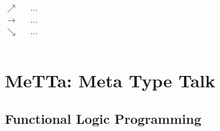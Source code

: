 \documentclass[aspectratio=169]{beamer}
\begin{document}
\begin{frame}
\begin{columns}
    \pause

    \column{1cm}
    \begin{center}
      $\nearrow$\\
      $\rightarrow$\\
      $\searrow$\\[2cm]
    \end{center}
    \vphantom{}

    \column{1cm}
    \begin{center}
      $\dots$\\
      $\dots$\\
      $\dots$\\[2cm]
    \end{center}
    \vphantom{}

  \end{columns}
\end{frame}

\section{MeTTa: Meta Type Talk}

\subsection{Functional Logic Programming}
\end{document}
